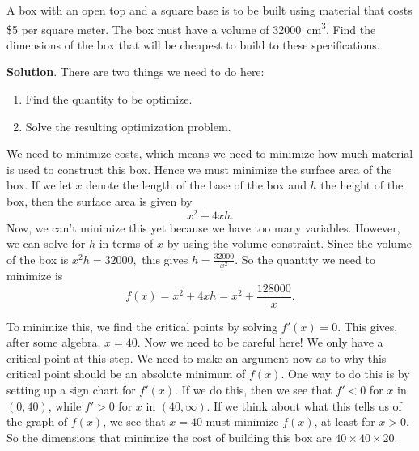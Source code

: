 \documentclass[10pt,]{book}
\theoremstyle{ptxplainnotitle}
\theoremstyle{ptxplaintitle}
\theoremstyle{ptxplainnotitle}
\theoremstyle{ptxplaintitle}
\theoremstyle{ptxplainnotitle}
\theoremstyle{ptxplaintitle}
\theoremstyle{ptxdefinitionnotitle}
\theoremstyle{ptxdefinitiontitle}
\theoremstyle{ptxdefinitionnotitle}
\theoremstyle{ptxdefinitiontitle}
\theoremstyle{ptxdefinitionnotitle}
\theoremstyle{ptxdefinitiontitle}
\theoremstyle{ptxdefinitionnotitle}
\theoremstyle{ptxdefinitiontitle}
\theoremstyle{ptxdefinitionnotitle}
\theoremstyle{ptxdefinitiontitle}
\numberwithin{equation}{section}
\begin{document}
\begin{example}\label{example-minimizing-material-costs}
\hypertarget{p-358}{}%
A box with an open top and a square base is to be built using material that costs \$5 per square meter. The box must have a volume of \SI{32000}{\centi\meter\tothe{3}}. Find the dimensions of the box that will be cheapest to build to these specifications.%
\par\smallskip%
\noindent\textbf{Solution}.\hypertarget{solution-79}{}\quad%
\hypertarget{p-359}{}%
There are two things we need to do here: \leavevmode%
\begin{enumerate}
\item\hypertarget{li-24}{}Find the quantity to be optimize.%
\item\hypertarget{li-25}{}Solve the resulting optimization problem.%
\end{enumerate}
 We need to minimize costs, which means we need to minimize how much material is used to construct this box. Hence we must minimize the surface area of the box. If we let \(x\) denote the length of the base of the box and \(h\) the height of the box, then the surface area is given by%
\begin{equation*}
x^{2} + 4xh.
\end{equation*}
Now, we can't minimize this yet because we have too many variables. However, we can solve for \(h\) in terms of \(x\) by using the volume constraint. Since the volume of the box is \(x^{2}h = 32000,\) this gives \(h = \frac{32000}{x^{2}}.\) So the quantity we need to minimize is%
\begin{equation*}
f(x) = x^{2} + 4xh = x^{2} + \frac{128000}{x}.
\end{equation*}
%
\par
\hypertarget{p-360}{}%
To minimize this, we find the critical points by solving \(f'(x) = 0\). This gives, after some algebra, \(x = 40\). Now we need to be careful here! We only have a critical point at this step. We need to make an argument now as to why this critical point should be an absolute minimum of \(f(x)\). One way to do this is by setting up a sign chart for \(f'(x)\). If we do this, then we see that \(f' < 0\) for \(x\) in \((0,40)\), while \(f' > 0\) for \(x\) in \((40,\infty)\). If we think about what this tells us of the graph of \(f(x)\), we see that \(x=40\) must minimize \(f(x)\), at least for \(x > 0\). So the dimensions that minimize the cost of building this box are \(40\times40\times20\).%
\end{example}
\end{document}

